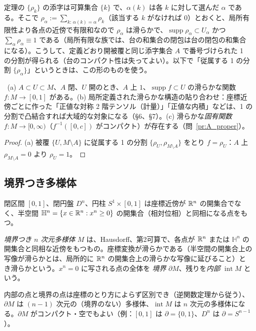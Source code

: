 \begin{rem}[添字のまとめ方]
定理の $\{\rho_k\}$ の添字は可算集合 $\{k\}$ で、$\alpha(k)$ は各 $k$ に対して選んだ $\alpha$ である。そこで $\rho_\alpha:=\sum_{k:\,\alpha(k)=\alpha}\rho_k$（該当する $k$ がなければ $0$）とおくと、局所有限性より各点の近傍で有限和なので $\rho_\alpha$ は滑らかで、$\operatorname{supp}\rho_\alpha\subset U_\alpha$ かつ $\sum_\alpha\rho_\alpha\equiv1$ である（局所有限な族では、台の和集合の閉包は台の閉包の和集合になる）。こうして、定義どおり開被覆と同じ添字集合 $A$ で番号づけられた 1 の分割が得られる（台のコンパクト性は失ってよい）。以下で「従属する 1 の分割 $\{\rho_\alpha\}$」というときは、この形のものを使う。
\end{rem}

\begin{cor}\label{A:cor:pou}
\tP\ (a) $A\subset U\subset M$、$A$ 閉、$U$ 開のとき、$A$ 上 $1$、$\operatorname{supp}f\subset U$ の滑らかな関数 $f:M\to[0,1]$ がある。(b) 局所定義された滑らかな構造の貼り合わせ：座標近傍ごとに作った「正値な対称 2 階テンソル（計量）」「正値な内積」などは、1 の分割で凸結合すれば大域的な対象になる（§6、§7）。(c) 滑らかな\emph{固有関数} $f:M\to[0,\infty)$（$f^{-1}([0,c])$ がコンパクト）が存在する（問~\ref{pr:A_proper}）。
\end{cor}
\begin{proof}
(a) 被覆 $\{U,M\setminus A\}$ に従属する 1 の分割 $\{\rho_U,\rho_{M\setminus A}\}$ をとり $f=\rho_U$：$A$ 上 $\rho_{M\setminus A}=0$ より $\rho_U=1$。
\end{proof}

\subsection{境界つき多様体}
閉区間 $[0,1]$、閉円盤 $D^n$、円柱 $S^1\times[0,1]$ は座標近傍が $\mathbb R^n$ の開集合でなく、半空間 $\mathbb H^n=\{x\in\mathbb R^n:x^n\ge0\}$ の開集合（相対位相）と同相になる点をもつ。

\begin{defn}
\emph{境界つき $n$ 次元多様体} $M$ は、Hausdorff、第2可算で、各点が $\mathbb R^n$ または $\mathbb H^n$ の開集合と同相な近傍をもつもの。座標変換が滑らかである（半空間の開集合上の写像が滑らかとは、局所的に $\mathbb R^n$ の開集合上の滑らかな写像に延びること）とき滑らかという。$x^n=0$ に写される点の全体を \emph{境界} $\partial M$、残りを\emph{内部} $\operatorname{int}M$ という。
\end{defn}
内部の点と境界の点は座標のとり方によらず区別でき（逆関数定理から従う\tC）、$\partial M$ は $(n-1)$ 次元の（境界のない）多様体、$\operatorname{int}M$ は $n$ 次元の多様体になる。$\partial M$ がコンパクト・空でもよい（例：$[0,1]$ は $\partial=\{0,1\}$、$D^n$ は $\partial=S^{n-1}$）。

